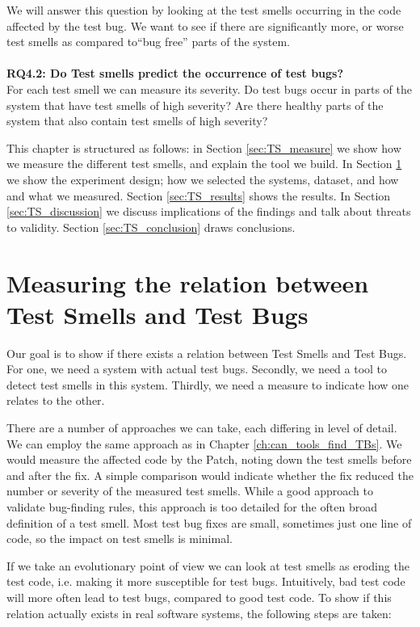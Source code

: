 \documentclass{uvamscse}
\begin{document}
We will answer this question by looking at the test smells occurring in the code affected by the test bug. We want to see if there are significantly more, or worse test smells as compared to``bug free'' parts of the system.\\ \\
\textbf{RQ4.2: Do Test smells predict the occurrence of test bugs?} \\

For each test smell we can measure its severity. Do test bugs occur in parts of the system that have test smells of high severity? Are there healthy parts of the system that  also contain test smells of high severity?

This chapter is structured as follows: in Section \ref{sec:TS_measure} we show how we measure the different test smells, and explain the tool we build. In Section \ref{sec:TS_relate} we show the experiment design; how we selected the systems, dataset, and how and what we measured. Section \ref{sec:TS_results} shows the results. In Section \ref{sec:TS_discussion} we discuss implications of the findings and talk about threats to validity. Section \ref{sec:TS_conclusion} draws conclusions.


\section{Measuring the relation between Test Smells and Test Bugs}
\label{sec:TS_relate}

Our goal is to show if there exists a relation between Test Smells and Test Bugs. For one, we need a system with actual test bugs. Secondly, we need a tool to detect test smells in this system. Thirdly, we need a measure to indicate how one relates to the other.

There are a number of approaches we can take, each differing in level of detail. We can employ the same approach as in Chapter \ref{ch:can_tools_find_TBs}. We would measure the affected code by the Patch, noting down the test smells before and after the fix. A simple comparison would indicate whether the fix reduced the number or severity of the measured test smells. While a good approach to validate bug-finding rules, this approach is too detailed for the often broad definition of a test smell. Most test bug fixes are small, sometimes just one line of code, so the impact on test smells is minimal.

If we take an evolutionary point of view we can look at test smells as eroding the test code, i.e. making it more susceptible for test bugs. Intuitively, bad test code will more often lead to test bugs, compared to good test code. To show if this relation actually exists in real software systems, the following steps are taken:
\end{document}
